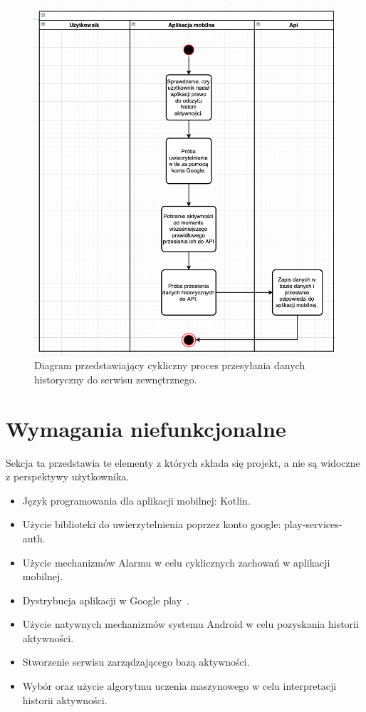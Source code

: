 \documentclass[a4paper,twoside,12pt]{book}
\begin{document}
\begin{figure}[!htbp]
    \centering
    \includegraphics[scale=0.5]{images/cyclic-stats-uml.png}
    \caption{Diagram przedstawiający cykliczny proces przesyłania danych historyczny do serwisu zewnętrznego.}
    \label{fig:cyclic_stats_uml}
\end{figure}

\FloatBarrier

\section{Wymagania niefunkcjonalne}
Sekcja ta przedstawia te elementy z których składa się projekt, a nie są widoczne z perspektywy użytkownika. 
\begin{itemize}
  \item Język programowania dla aplikacji mobilnej: Kotlin.
  \item Użycie biblioteki do uwierzytelnienia poprzez konto google: play-services-auth.
  \item Użycie mechanizmów Alarmu w celu cyklicznych zachowań w aplikacji mobilnej.
  \item Dystrybucja aplikacji w Google play~\cite{publish_app}.
  \item Użycie natywnych mechanizmów systemu Android w celu pozyskania historii aktywności.
  \item Stworzenie serwisu zarządzającego bazą aktywności.
  \item Wybór oraz użycie algorytmu uczenia maszynowego w celu interpretacji historii aktywności.
\end{itemize}
\end{document}
